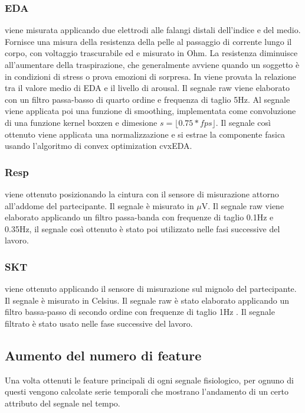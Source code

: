 \subsubsection{EDA}
viene misurata applicando due elettrodi alle falangi distali dell'indice e del medio. Fornisce una misura della resistenza della pelle al passaggio di corrente lungo il corpo, con voltaggio trascurabile ed e misurato in Ohm. La resistenza diminuisce all'aumentare della traspirazione, che generalmente avviene quando un soggetto è in condizioni di stress o prova emozioni di sorpresa. In \cite{lang1993looking} viene provata la relazione tra il valore medio di EDA e il livello di arousal.
Il segnale raw viene elaborato con un filtro passa-basso di quarto ordine e frequenza di taglio 5Hz. Al segnale viene applicata poi una funzione di smoothing, implementata come convoluzione di una funzione kernel boxzen e dimesione $s = \lfloor0.75 * fps\rfloor$.
Il segnale così ottenuto viene applicata una normalizzazione e si estrae la componente fasica usando l'algoritmo di convex optimization cvxEDA\cite{greco2015cvxeda}.

\subsubsection{Resp}
viene ottenuto posizionando la cintura con il sensore di misurazione attorno all'addome del partecipante. Il segnale è misurato in $\mu$V. Il segnale raw viene elaborato applicando un filtro passa-banda con frequenze di taglio 0.1Hz e 0.35Hz, il segnale così ottenuto è stato poi utilizzato nelle fasi successive del lavoro.

\subsubsection{SKT}
viene ottenuto applicando il sensore di misurazione sul mignolo del partecipante. Il segnale è misurato in Celsius. Il segnale raw è stato elaborato applicando un filtro bassa-passo di secondo ordine con frequenze di taglio 1Hz \cite{palanisamy2013multiple}. Il segnale filtrato è stato usato nelle fase successive del lavoro.


\subsection{Aumento del numero di feature}
Una volta ottenuti le feature principali di ogni segnale fisiologico, per ognuno di questi vengono calcolate serie temporali che mostrano l'andamento di un certo attributo del segnale nel tempo.

